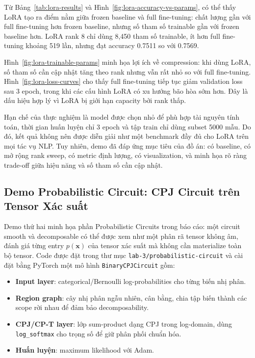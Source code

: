 Từ Bảng~\ref{tab:lora-results} và Hình~\ref{fig:lora-accuracy-vs-params}, có
thể thấy LoRA tạo ra điểm nằm giữa frozen baseline và full fine-tuning: chất
lượng gần với full fine-tuning hơn frozen baseline, nhưng số tham số trainable
gần với frozen baseline hơn. LoRA rank 8 chỉ dùng 8,450 tham số trainable, ít
hơn full fine-tuning khoảng 519 lần, nhưng đạt accuracy 0.7511 so với 0.7569.

Hình~\ref{fig:lora-trainable-params} minh họa lợi ích về compression: khi dùng
LoRA, số tham số cần cập nhật tăng theo rank nhưng vẫn rất nhỏ so với full
fine-tuning. Hình~\ref{fig:lora-loss-curves} cho thấy full fine-tuning tiếp tục
giảm validation loss sau 3 epoch, trong khi các cấu hình LoRA có xu hướng bão
hòa sớm hơn. Đây là dấu hiệu hợp lý vì LoRA bị giới hạn capacity bởi rank thấp.

Hạn chế của thực nghiệm là model được chọn nhỏ để phù hợp tài nguyên tính toán,
thời gian huấn luyện chỉ 3 epoch và tập train chỉ dùng subset 5000 mẫu. Do đó,
kết quả không nên được diễn giải như một benchmark đầy đủ cho LoRA trên mọi tác
vụ NLP. Tuy nhiên, demo đã đáp ứng mục tiêu của đồ án: có baseline, có mở rộng
rank sweep, có metric định lượng, có visualization, và minh họa rõ ràng
trade-off giữa hiệu năng và số tham số cần cập nhật.

\subsection{Demo Probabilistic Circuit: CPJ Circuit trên Tensor Xác suất}

Demo thứ hai minh họa phần Probabilistic Circuits trong báo cáo: một circuit
smooth và decomposable có thể được xem như một phân rã tensor không âm, đánh giá
từng entry $p(\mathbf{x})$ của tensor xác suất mà không cần materialize toàn bộ
tensor. Code được đặt trong thư mục \texttt{lab-3/probabilistic-circuit} và cài
đặt bằng PyTorch một mô hình \texttt{BinaryCPJCircuit} gồm:

\begin{itemize}
    \item \textbf{Input layer}: categorical/Bernoulli log-probabilities cho từng
    biến nhị phân.
    \item \textbf{Region graph}: cây nhị phân ngẫu nhiên, cân bằng, chia tập biến
    thành các scope rời nhau để đảm bảo decomposability.
    \item \textbf{CPJ/CP-T layer}: lớp sum-product dạng CPJ trong log-domain,
    dùng \texttt{log\_softmax} cho trọng số để giữ phân phối chuẩn hóa.
    \item \textbf{Huấn luyện}: maximum likelihood với Adam.
\end{itemize}

